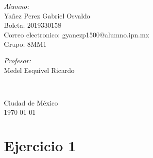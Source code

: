 \documentclass[10pt]{article}\usepackage[]{graphicx}\usepackage[]{color}
\begin{document}
\begin{center}
\begin{minipage}{0.46\textwidth}
\begin{flushleft}
\emph{Alumno:}\\	
Yañez Perez Gabriel Osvaldo\\
Boleta: 2019330158\\
Correo electronico: gyanezp1500@alumno.ipn.mx\\
Grupo: 8MM1
\end{flushleft}																		%
\end{minipage}		
\begin{minipage}{0.52\textwidth}		
\vspace{-0.6cm}											%
\begin{flushright} \large															%
\emph{Profesor:} \\																	%
Medel Esquivel Ricardo\\
\end{flushright}																	%
\end{minipage}	
\vspace*{1cm}
 	
 		\\																		%
\vspace{2cm} 																				
\begin{center}	
Ciudad de México  \\
{\large \today}																	%
 			\end{center}												  						
\end{center}							 											
																					
\newpage																			

\tableofcontents 
\newpage

\section{Ejercicio 1}
\end{document}
